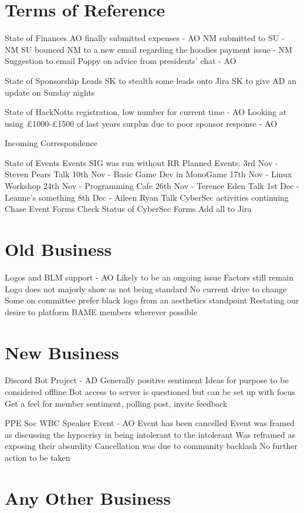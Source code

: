 \documentclass[11pt,hacksoc]{meetingmins}
\begin{document}
\section{Terms of Reference}
\begin{items}
\item {State of Finances}
\subitem AO finally submitted expenses - AO
\subitem NM submitted to SU - NM
\subitem SU bounced NM to a new email regarding the hoodies payment issue - NM
\subitem Suggestion to email Poppy on advice from presidents' chat - AO
\item {State of Sponsorship Leads}
\subitem SK to stealth some leads onto Jira
\subitem SK to give AD an update on Sunday nights
\item {State of HackNotts}
 registration, low number for current time - AO
\subitem Looking at using £1000-£1500 of last years surplus due to poor sponsor response - AO
\item {Incoming Correspondence}
\item {State of Events}
\subitem Events SIG was run without RR
\subitem Planned Events:
\subsubitem 3rd Nov - Steven Pears Talk
\subsubitem 10th Nov - Basic Game Dev in MonoGame 
\subsubitem 17th Nov - Linux Workshop
\subsubitem 24th Nov - Programming Cafe
\subsubitem 26th Nov - Terence Eden Talk
\subsubitem 1st Dec - Leanne's something
\subsubitem 8th Dec - Aileen Ryan Talk
\subsubitem CyberSec activities continuing
\subitem Chase Event Forms
\subitem Check Status of CyberSec Forms
\subitem Add all to Jira
\end{items}

\section{Old Business}
\begin{items}
\item Logos and BLM support - AO
\subitem Likely to be an ongoing issue
\subitem Factors still remain
\subitem Logo does not majorly show as not being standard
\subitem No current drive to change
\subitem Some on committee prefer black logo from an aesthetics standpoint
\subitem Restating our desire to platform BAME members wherever possible
\end{items}

\section{New Business}
\begin{items}
\item Discord Bot Project - AD
\subitem Generally positive sentiment
\subitem Ideas for purpose to be considered offline
\subitem Bot access to server is questioned but can be set up with focus
\subitem Get a feel for member sentiment, polling post, invite feedback
\item PPE Soc WBC Speaker Event - AO
\subitem Event has been cancelled
\subitem Event was framed as discussing the hypocrisy in being intolerant to the intolerant
\subsubitem Was reframed as exposing their absurdity
\subitem Cancellation was due to community backlash
\subitem No further action to be taken
\end{items}

\section{Any Other Business}


\vspace{1em}
\end{document}
